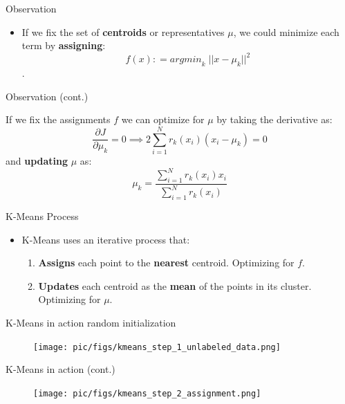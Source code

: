 \documentclass[serif, aspectratio=169]{beamer}
\begin{document}
\begin{frame}{Observation}
    \begin{itemize}

\item If we fix the set of \textbf{centroids} or representatives $\mu$, we could minimize each term by \textbf{assigning}:
  $$ f(x) : = \textit{argmin}_k \; ||x - \mu_k||^2 $$.
  
    \end{itemize}
\end{frame}

\begin{frame}{Observation (cont.)}
    
     If we fix the assignments $f$ we can optimize for $\mu$ by taking the derivative as:
    $$
        \frac{\partial J}{\partial \mu_k } = 0 \implies 2 \sum_{i=1}^{N} r_k(x_i) \left(x_i - \mu_k \right) = 0
    $$
and \textbf{updating} $\mu$ as:
    $$
        \mu_k = \frac{\sum_{i=1}^{N}{r_k(x_i)x_i}}{\sum_{i=1}^{N} r_k(x_i)}
    $$

\end{frame}

\begin{frame}{K-Means Process}
\begin{itemize}
\item K-Means uses an iterative process that:
\begin{enumerate}
    \item \textbf{Assigns} each point to the \textbf{nearest} centroid. Optimizing for $f$.
    \item \textbf{Updates} each centroid as the \textbf{mean} of the points in its cluster. Optimizing for $\mu$.
\end{enumerate}


    \end{itemize}
\end{frame}

\begin{frame}{K-Means in action}
random initialization
    \begin{figure}
        \centering
        \texttt{[image: pic/figs/kmeans\_step\_1\_unlabeled\_data.png]}
    \end{figure}
\end{frame}
\begin{frame}{K-Means in action (cont.)}
    \begin{figure}
        \centering
        \texttt{[image: pic/figs/kmeans\_step\_2\_assignment.png]}
    \end{figure}
\end{frame}
\end{document}
